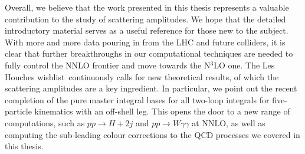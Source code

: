 \documentclass[main.tex]{subfiles}
\begin{document}
Overall, we believe that the work presented in this thesis represents a valuable contribution to the study of scattering amplitudes. We hope that the detailed introductory material serves as a useful reference for those new to the subject. With more and more data pouring in from the LHC and future colliders, it is clear that further breakthroughs in our computational techniques are needed to fully control the NNLO frontier and move towards the N$^3$LO one. The Les Houches wishlist~\cite{Huss:2022ful}continuously calls for new theoretical results, of which the scattering amplitudes are a key ingredient. In particular, we point out the recent completion of the pure master integral bases for all two-loop integrals for five-particle kinematics with an off-shell leg. This opens the door to a new range of computations, such as $pp \rightarrow H+2j$ and $pp \rightarrow W \gamma \gamma $ at NNLO, as well as computing the sub-leading colour corrections to the QCD processes we covered in this thesis.
\end{document}
